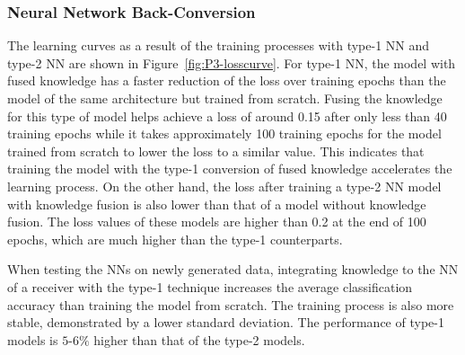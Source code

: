 \documentclass[lettersize,journal]{IEEEtran}
\begin{document}
\subsubsection{Neural Network Back-Conversion}\label{jpaper2-results-integration}

The learning curves as a result of the training processes with type-1 NN and type-2 NN are shown in Figure~\ref{fig:P3-losscurve}. For type-1 NN, the model with fused knowledge has a faster reduction of the loss over training epochs than the model of the same architecture but trained from scratch. Fusing the knowledge for this type of model helps achieve a loss of around 0.15 after only less than 40 training epochs while it takes approximately 100 training epochs for the model trained from scratch to lower the loss to a similar value. This indicates that training the model with the type-1 conversion of fused knowledge accelerates the learning process. On the other hand, the loss after training a type-2 NN model with knowledge fusion is also lower than that of a model without knowledge fusion. The loss values of these models are higher than 0.2 at the end of 100 epochs, which are much higher than the type-1 counterparts.


\begin{figure*}[!t]
\centering
    \hfill
    \hfill
    \hfill

    \caption{Learning curves in four cases: (a) Type-1 NN - trained from scratch, (b) Type-2 NN - trained from scratch, (c) Type-1 NN - retrained after knowledge fusion, and (d) Type-2 NN - retrained after knowledge fusion.}
\label{fig:P3-losscurve}
\end{figure*}

When testing the NNs on newly generated data, integrating knowledge to the NN of a receiver with the type-1 technique increases the average classification accuracy than training the model from scratch. The training process is also more stable, demonstrated by a lower standard deviation. The performance of type-1 models is $5$-$6\%$ higher than that of the type-2 models.
\end{document}
